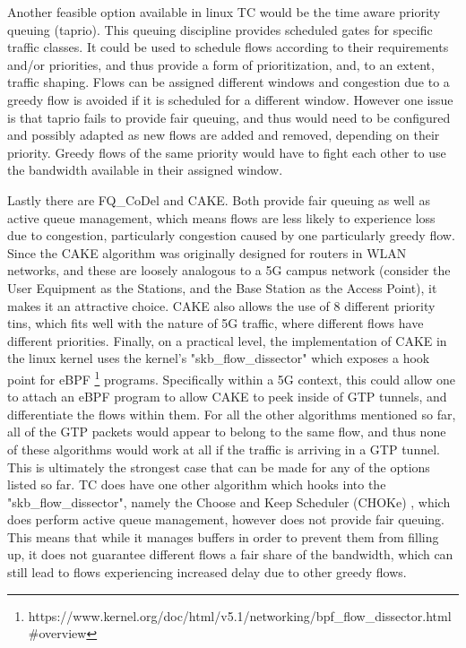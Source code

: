 Another feasible option available in linux TC would be the time aware priority queuing (taprio). This queuing discipline provides scheduled gates for specific traffic classes. It could be used to schedule flows according to their requirements and/or priorities, and thus provide a form of prioritization, and, to an extent, traffic shaping. Flows can be assigned different windows and congestion due to a greedy flow is avoided if it is scheduled for a different window. However one issue is that taprio fails to provide fair queuing, and thus would need to be configured and possibly adapted as new flows are added and removed, depending on their priority. Greedy flows of the same priority would have to fight each other to use the bandwidth available in their assigned window.

Lastly there are FQ\_CoDel and CAKE. Both provide fair queuing as well as active queue management, which means flows are less likely to experience loss due to congestion, particularly congestion caused by one particularly greedy flow. Since the CAKE algorithm was originally designed for routers in WLAN networks, and these are loosely analogous to a 5G campus network (consider the User Equipment as the Stations, and the Base Station as the Access Point), it makes it an attractive choice. CAKE also allows the use of 8 different priority tins, which fits well with the nature of 5G traffic, where different flows have different priorities. Finally, on a practical level, the implementation of CAKE in the linux kernel uses the kernel's "skb\_flow\_dissector" which exposes a hook point for eBPF \footnote{https://www.kernel.org/doc/html/v5.1/networking/bpf\_flow\_dissector.html\#overview} programs. Specifically within a 5G context, this could allow one to attach an eBPF program to allow CAKE to peek inside of GTP tunnels, and differentiate the flows within them. For all the other algorithms mentioned so far, all of the GTP packets would appear to belong to the same flow, and thus none of these algorithms would work at all if the traffic is arriving in a GTP tunnel. This is ultimately the strongest case that can be made for any of the options listed so far. TC does have one other algorithm which hooks into the "skb\_flow\_dissector", namely the Choose and Keep Scheduler (CHOKe) \cite{pan2000choke}, which does perform active queue management, however does not provide fair queuing. This means that while it manages buffers in order to prevent them from filling up, it does not guarantee different flows a fair share of the bandwidth, which can still lead to flows experiencing increased delay due to other greedy flows.

